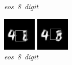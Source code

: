 \documentclass{article} %
\begin{document}
\begin{figure}[t]
  \caption{\mbox{\textit{eos 8 digit}}}
\endminipage\hfill
{}
  \includegraphics[width=\linewidth]{figures/4-8-18.png}
  \caption{\mbox{\textit{eos 8 digit}}}
\endminipage\hfill
{}
  \includegraphics[width=\linewidth]{figures/4-8-22.png}

\end{figure}
\end{document}
